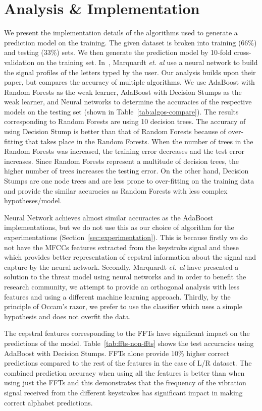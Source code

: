 \documentclass[11pt,conference]{IEEEtran}
\begin{document}
\section{Analysis \& Implementation}
\label{sec:implementation}
We present the implementation details of the algorithms used to generate a prediction model on the training. The given dataset is broken into training (66\%) and testing (33\%) sets. We then generate the prediction model by 10-fold cross-validation on the training set. In~\cite{spiphone}, Marquardt \emph{et. al} use a neural network to build the signal profiles of the letters typed by the user. Our analysis builds upon their paper, but compares the accuracy of multiple algorithms. We use AdaBoost with Random Forests as the weak learner, AdaBoost with Decision Stumps as the weak learner, and Neural networks to determine the accuracies of the respective models on the testing set (shown in Table~\ref{tab:algos-compare}). The results corresponding to Random Forests are using 10 decision trees. The accuracy of using Decision Stump is better than that of Random Forests because of over-fitting that takes place in the Random Forests. When the number of trees in the Random Forests was increased, the training error decreases and the test error increases. Since Random Forests represent a multitude of decision trees, the higher number of trees increases the testing error. On the other hand, Decision Stumps are one node trees and are less prone to over-fitting on the training data and provide the similar accuracies as Random Forests with less complex hypotheses/model. 

Neural Network achieves almost similar accuracies as the AdaBoost implementations, but we do not use this as our choice of algorithm for the experimentations (Section~\ref{sec:experimentation}). This is because firstly we do not have the MFCCs features extracted from the keystroke signal and these which provides better representation of cepstral information about the signal and capture by the neural network. Secondly, Marquardt \emph{et. al} have presented a solution to the threat model using neural networks and in order to benefit the research community, we attempt to provide an orthogonal analysis with less features and using a different machine learning approach. Thirdly, by the principle of Occam's razor, we prefer to use the classifier which uses a simple hypothesis and does not overfit the data.

The cepstral features corresponding to the FFTs have significant impact on the predictions of the model. Table~\ref{tab:ffts-non-ffts} shows the test accuracies using AdaBoost with Decision Stumps. FFTs alone provide 10\% higher correct predictions compared to the rest of the features in the case of L/R dataset. The combined prediction accuracy when using all the features is better than when using just the FFTs and this demonstrates that the frequency of the vibration signal received from the different keystrokes has significant impact in making correct alphabet predictions.
\end{document}
